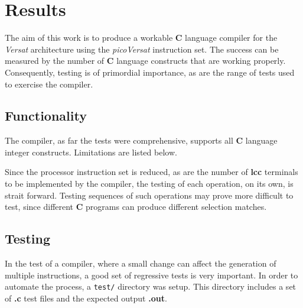 
\chapter{Results}
\label{chapter:results}

The aim of this work is to produce a workable {\bf C} language
compiler for the {\it Versat} architecture using the {\it picoVersat}
instruction set.
The success can be measured by the number of {\bf C} language
constructs that are working properly.
Consequently, testing is of primordial importance, as are the range
of tests used to exercise the compiler.

\section{Functionality}

The compiler, as far the tests were comprehensive,
supports all {\bf C} language integer constructs.
Limitations are listed below.

Since the processor instruction set is reduced, as are the
number of {\bf lcc} terminals to be implemented by the compiler,
the testing of each operation, on its own, is strait
forward.
Testing sequences of such operations may prove more
difficult to test, since different {\bf C} programs
can produce different selection matches.

\section{Testing}

In the test of a compiler, where a small change can affect the
generation of multiple instructions, a good set of
regressive tests is very important.
In order to automate the process, a {\tt test/} directory
was setup.
This directory includes a set of {\bf .c} test files and
the expected output {\bf .out}.

